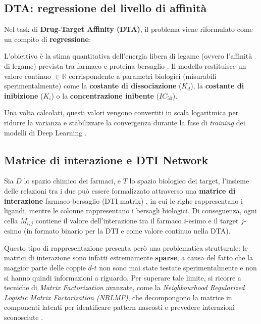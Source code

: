 \subsection{DTA: regressione del livello di affinità}
Nel task di \textbf{Drug-Target Affinity (DTA)}, il problema viene riformulato come un compito di \textbf{regressione}:

L'obiettivo è la stima quantitativa
dell'energia libera di legame (ovvero l'affinità di legame) prevista tra
farmaco e proteina-bersaglio \cite{mondalAIdrivenDrugTarget2026a}.
Il modello restituisce un valore continuo $\in \mathbb{R}$ corrispondente a parametri biologici (misurabili sperimentalmente) come la
\textbf{costante di dissociazione} ($K_d$), la \textbf{costante di
inibizione} ($K_i$) o la \textbf{concentrazione inibente} ($IC_{50}$).

Una volta calcolati, questi valori vengono convertiti in scala logaritmica
per ridurre la varianza e stabilizzare la convergenza durante la fase di \textit{training} dei
modelli di Deep Learning \cite{kumarPredictingDrugtargetInteractions2026a}.

\subsection{Matrice di interazione e DTI Network}
Sia $D$ lo spazio chimico dei farmaci, e $T$ lo spazio biologico dei
target, l'insieme delle relazioni tra i due può essere formalizzato
attraverso una \textbf{matrice di interazione} farmaco-bersaglio
(DTI matrix) \cite{mondalAIdrivenDrugTarget2026a}, in cui le righe
rappresentano i ligandi, mentre le colonne rappresentano i bersagli
biologici.
Di conseguenza, ogni cella $M_{i,j}$ contiene il valore dell'interazione
tra il farmaco $i$-esimo e il target $j$-esimo (in formato binario per la
DTI e come valore continuo nella DTA).

Questo tipo di rappresentazione presenta però una problematica
strutturale: le matrici di interazione sono infatti estremamente
\textbf{sparse}, a causa del fatto che la maggior parte delle coppie
$d$-$t$ non sono mai state testate sperimentalmente e non si hanno quindi
informazioni a riguardo.
Per superare tale limite, si ricorre a tecniche di
\textit{Matrix Factorization} avanzate, come la \textit{Neighbourhood
Regularized Logistic Matrix Factorization (NRLMF)}, che decompongono la
matrice in componenti latenti per identificare pattern nascosti e
prevedere interazioni sconosciute \cite{mondalAIdrivenDrugTarget2026a}.

